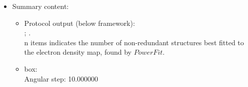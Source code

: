 \begin{itemize}
\begin{itemize}
   \end{itemize}
   
  \item Summary content:\\
  
   \begin{itemize}
     \item Protocol output (below \scipion framework):\\ ; .\\ n items indicates the number of non-redundant structures best fitted to the electron density map, found by $PowerFit$.\\
     \item {} box:\\Angular step: 10.000000\\
    \end{itemize}
  
 \end{itemize}
